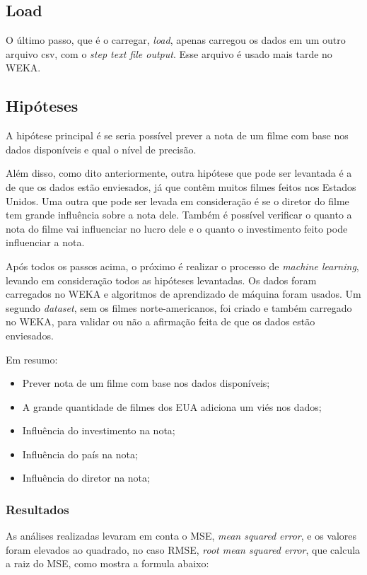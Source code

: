 \subsection{Load}
O último passo, que é o carregar, \textit{load}, apenas carregou os dados em um outro arquivo csv, com o \textit{step text file output}. Esse arquivo é usado mais tarde no WEKA.

\subsection{Hipóteses}
A hipótese principal é se seria possível prever a nota de um filme com base nos dados disponíveis e qual o nível de precisão.

Além disso, como dito anteriormente, outra hipótese que pode ser levantada é a de que os dados estão enviesados, já que contêm muitos filmes feitos nos Estados Unidos. Uma outra que pode ser levada em consideração é se o diretor do filme tem grande influência sobre a nota dele. Também é possível verificar o quanto a nota do filme vai influenciar no lucro dele e o quanto o investimento feito pode influenciar a nota.

Após todos os passos acima, o próximo é realizar o processo de \textit{machine learning}, levando em consideração todos as hipóteses levantadas. Os dados foram carregados no WEKA e algoritmos de aprendizado de máquina foram usados. Um segundo \textit{dataset}, sem os filmes norte-americanos, foi criado e também carregado no WEKA, para validar ou não a afirmação feita de que os dados estão enviesados. 

Em resumo:

\begin{itemize}
    \item Prever nota de um filme com base nos dados disponíveis;
    \item A grande quantidade de filmes dos EUA adiciona um viés nos dados;
    \item Influência do investimento na nota;
    \item Influência do país na nota;
    \item Influência do diretor na nota;
\end{itemize}

\subsubsection{Resultados}
As análises realizadas levaram em conta o MSE, \textit{mean squared error}, e os valores foram elevados ao quadrado, no caso RMSE, \textit{root mean squared error}, que calcula a raiz do MSE, como mostra a formula abaixo:

